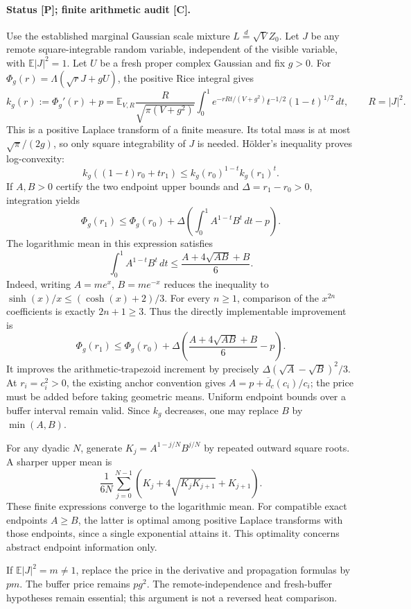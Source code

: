 \paragraph{Status [P]; finite arithmetic audit [C].}
Use the established marginal Gaussian scale mixture
$L\overset d=\sqrt VZ_0$. Let $J$ be any remote square-integrable random
variable, independent of the visible variable, with $\mathbb E|J|^2=1$.
Let $U$ be a fresh proper complex Gaussian and fix $g>0$.
For $\Phi_g(r)=\Lambda(\sqrt rJ+gU)$, the positive Rice integral gives
\[
 k_g(r):=\Phi_g'(r)+p
 =\mathbb E_{V,R}\frac{R}{\sqrt{\pi(V+g^2)}}
  \int_0^1 e^{-rRt/(V+g^2)}t^{-1/2}(1-t)^{1/2}\,dt,\qquad R=|J|^2.
\]
This is a positive Laplace transform of a finite measure. Its total
mass is at most $\sqrt\pi/(2g)$, so only square integrability of $J$
is needed. H\"older's inequality proves log-convexity:
\[
 k_g((1-t)r_0+tr_1)\le k_g(r_0)^{1-t}k_g(r_1)^t.
\]
If $A,B>0$ certify the two endpoint upper bounds and
$\Delta=r_1-r_0>0$, integration yields
\[
 \Phi_g(r_1)\le\Phi_g(r_0)+
 \Delta\left(\int_0^1A^{1-t}B^t\,dt-p\right).
\]
The logarithmic mean in this expression satisfies
\[
 \int_0^1A^{1-t}B^t\,dt
 \le\frac{A+4\sqrt{AB}+B}{6}.
\]
Indeed, writing $A=me^x$, $B=me^{-x}$ reduces the inequality to
$\sinh(x)/x\le(\cosh(x)+2)/3$. For every $n\ge1$, comparison of the
$x^{2n}$ coefficients is exactly $2n+1\ge3$.
Thus the directly implementable improvement is
\begin{equation}
 \boxed{\Phi_g(r_1)\le\Phi_g(r_0)+
 \Delta\left(\frac{A+4\sqrt{AB}+B}{6}-p\right).}
 \label{eq:geometric-baseline-propagation}
\end{equation}
It improves the arithmetic-trapezoid increment by precisely
$\Delta(\sqrt A-\sqrt B)^2/3$.
At $r_i=c_i^2>0$, the existing anchor convention gives
$A=p+\overline d_c(c_i)/c_i$; the price must be added before
taking geometric means. Uniform endpoint bounds over a buffer interval
remain valid. Since $k_g$ decreases, one may replace $B$ by $\min(A,B)$.

For any dyadic $N$, generate $K_j=A^{1-j/N}B^{j/N}$ by repeated
outward square roots. A sharper upper mean is
\[
 \frac1{6N}\sum_{j=0}^{N-1}
   (K_j+4\sqrt{K_jK_{j+1}}+K_{j+1}).
\]
These finite expressions converge to the logarithmic mean. For compatible
exact endpoints $A\ge B$, the latter is optimal among positive Laplace
transforms with those endpoints, since a single exponential attains it.
This optimality concerns abstract endpoint information only.

If $\mathbb E|J|^2=m\ne1$, replace the price in the derivative and
propagation formulas by $pm$. The buffer price remains $pg^2$.
The remote-independence and fresh-buffer hypotheses remain essential;
this argument is not a reversed heat comparison.

